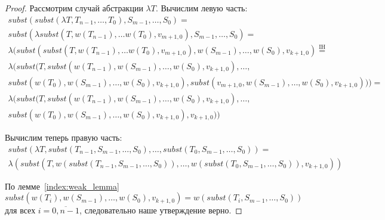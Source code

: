 \begin{proof}
  Рассмотрим случай абстракции $\lambda T$. Вычислим левую часть:
  \begin{gather*}
    subst(subst(\lambda T, T_{n-1}, \dots, T_{0}), S_{m-1}, \dots, S_{0}) = \\
    subst(\lambda subst( T, w(T_{n - 1}), \dots w(T_{0}), v_{m+1, 0} ), S_{m - 1}, \dots, S_{0}) = \\
    \lambda(subst(subst( T, w(T_{n - 1}), \dots w(T_{0}), v_{m+1, 0} ), w(S_{m-1}), \dots, w(S_{0}), v_{k+1, 0}) \overset{\mathrm{IH}}{=} \\
    \lambda(subst(T, subst(w(T_{n-1}), w(S_{m-1}), \dots, w(S_{0}), v_{k+1, 0}), \dots, \\
    subst(w(T_{0}), w(S_{m-1}), \dots, w(S_{0}), v_{k+1, 0}), subst(v_{m+1, 0}, w(S_{m-1}), \dots, w(S_{0}), v_{k+1, 0}))) = \\
    \lambda(subst(T, subst(w(T_{n-1}), w(S_{m-1}), \dots, w(S_{0}), v_{k+1, 0}), \dots, \\
    subst(w(T_{0}), w(S_{m-1}), \dots, w(S_{0}), v_{k+1, 0}), v_{k+1, 0}))
  \end{gather*}

  Вычислим теперь правую часть:
  \begin{gather*}
    subst(\lambda T, subst(T_{n-1}, S_{m - 1}, \dots, S_{0}), \dots, subst(T_{0}, S_{m - 1}, \dots, S_{0})) = \\
    \lambda(subst(T, w(subst(T_{n-1}, S_{m - 1}, \dots, S_{0})), \dots, w(subst(T_{0}, S_{m - 1}, \dots, S_{0})), v_{k+1, 0}))
  \end{gather*}

  По лемме~\ref{index:weak_lemma} $subst(w(T_{i}), w(S_{m-1}), \dots, w(S_{0}), v_{k+1, 0}) = w(subst(T_{i}, S_{m - 1}, \dots, S_{0}))$ для всех $i=\overline{0, n-1}$, следовательно наше утверждение верно.
\end{proof}
